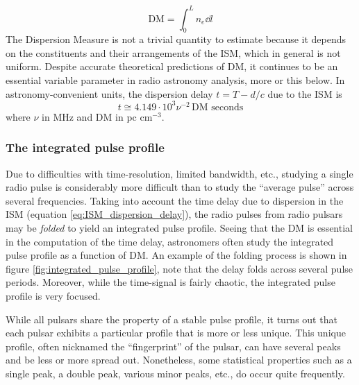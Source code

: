 \documentclass[nofootinbib,reprint,english]{revtex4-1}
\begin{document}
\begin{equation}\label{eq:Dispersion_Measure}
\text{DM}=\int_0^Ln_e\dd{l}
\end{equation}
The Dispersion Measure is not a trivial quantity to estimate because it depends on the constituents and their arrangements of the ISM, which in general is not uniform. Despite accurate theoretical predictions of DM, it continues to be an essential variable parameter in radio astronomy analysis, more or this below. In astronomy-convenient units, the dispersion delay \(t=T-d/c\) due to the ISM is
\begin{equation}\label{eq:ISM_dispersion_delay}
t\cong4.149\cdot10^3\nu^{-2}\,\text{DM}\text{ seconds}
\end{equation}
where \(\nu\) in MHz and DM in pc \(\text{cm}^{-3}\).
\subsubsection{The integrated pulse profile}
Due to difficulties with time-resolution, limited bandwidth, etc., studying a single radio pulse is considerably more difficult than to study the ``average pulse'' across several frequencies. Taking into account the time delay due to dispersion in the ISM (equation \eqref{eq:ISM_dispersion_delay}), the radio pulses from radio pulsars may be \emph{folded} to yield an integrated pulse profile. Seeing that the DM is essential in the computation of the time delay, astronomers often study the integrated pulse profile as a function of DM. An example of the folding process is shown in figure \ref{fig:integrated_pulse_profile}, note that the delay folds across several pulse periods. Moreover, while the time-signal is fairly chaotic, the integrated pulse profile is very focused.

While all pulsars share the property of a stable pulse profile, it turns out that each pulsar exhibits a particular profile that is more or less unique. This unique profile, often nicknamed the ``fingerprint'' of the pulsar, can have several peaks and be less or more spread out. Nonetheless, some statistical properties such as a single peak, a double peak, various minor peaks, etc., do occur quite frequently.
\end{document}
